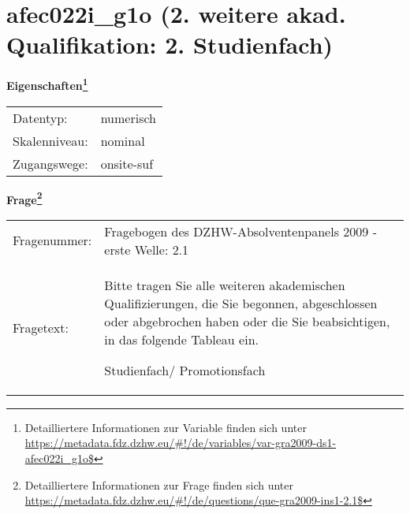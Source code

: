 
    \setcounter{footnote}{0}

    \vspace*{-1.8cm}
	\section{afec022i\_g1o (2. weitere akad. Qualifikation: 2. Studienfach)}
	\label{section:afec022i_g1o}



    \vspace*{0.5cm}
    \noindent\textbf{Eigenschaften\footnote{Detailliertere Informationen zur Variable finden sich unter
		\url{https://metadata.fdz.dzhw.eu/\#!/de/variables/var-gra2009-ds1-afec022i_g1o$}}}\\
	\begin{tabularx}{\hsize}{@{}lX}
	Datentyp: & numerisch \\
	Skalenniveau: & nominal \\
	Zugangswege: &
	  onsite-suf
 \\
    \end{tabularx}



				\vspace*{0.5cm}
                \noindent\textbf{Frage\footnote{Detailliertere Informationen zur Frage finden sich unter
		              \url{https://metadata.fdz.dzhw.eu/\#!/de/questions/que-gra2009-ins1-2.1$}}}\\
				\begin{tabularx}{\hsize}{@{}lX}
					Fragenummer: &
					  Fragebogen des DZHW-Absolventenpanels 2009 - erste Welle:
					  2.1
 \\
					Fragetext: & Bitte tragen Sie alle weiteren akademischen Qualifizierungen, die Sie begonnen, abgeschlossen oder abgebrochen haben oder die Sie beabsichtigen, in das folgende Tableau ein.\par  Studienfach/ Promotionsfach \\
				\end{tabularx}





